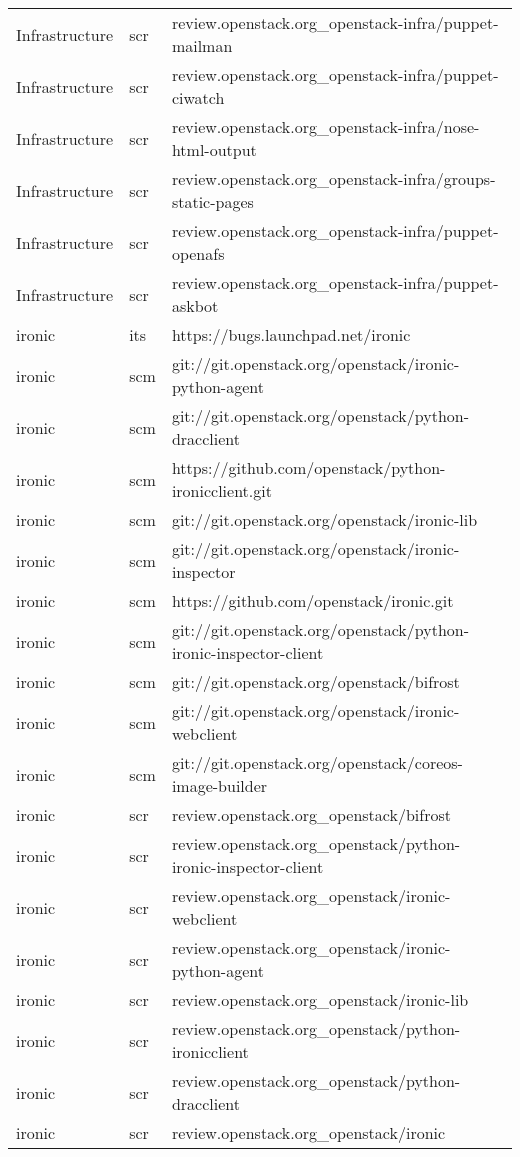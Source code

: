 \begin{center}
\begin{longtable}{|p{4cm}|p{1cm}|p{10cm}|}
Infrastructure&scr&review.openstack.org\_openstack-infra/puppet-mailman\\ 
Infrastructure&scr&review.openstack.org\_openstack-infra/puppet-ciwatch\\ 
Infrastructure&scr&review.openstack.org\_openstack-infra/nose-html-output\\ 
Infrastructure&scr&review.openstack.org\_openstack-infra/groups-static-pages\\ 
Infrastructure&scr&review.openstack.org\_openstack-infra/puppet-openafs\\ 
Infrastructure&scr&review.openstack.org\_openstack-infra/puppet-askbot\\ 
ironic&its&https://bugs.launchpad.net/ironic\\ 
ironic&scm&git://git.openstack.org/openstack/ironic-python-agent\\ 
ironic&scm&git://git.openstack.org/openstack/python-dracclient\\ 
ironic&scm&https://github.com/openstack/python-ironicclient.git\\ 
ironic&scm&git://git.openstack.org/openstack/ironic-lib\\ 
ironic&scm&git://git.openstack.org/openstack/ironic-inspector\\ 
ironic&scm&https://github.com/openstack/ironic.git\\ 
ironic&scm&git://git.openstack.org/openstack/python-ironic-inspector-client\\ 
ironic&scm&git://git.openstack.org/openstack/bifrost\\ 
ironic&scm&git://git.openstack.org/openstack/ironic-webclient\\ 
ironic&scm&git://git.openstack.org/openstack/coreos-image-builder\\ 
ironic&scr&review.openstack.org\_openstack/bifrost\\ 
ironic&scr&review.openstack.org\_openstack/python-ironic-inspector-client\\ 
ironic&scr&review.openstack.org\_openstack/ironic-webclient\\ 
ironic&scr&review.openstack.org\_openstack/ironic-python-agent\\ 
ironic&scr&review.openstack.org\_openstack/ironic-lib\\ 
ironic&scr&review.openstack.org\_openstack/python-ironicclient\\ 
ironic&scr&review.openstack.org\_openstack/python-dracclient\\ 
ironic&scr&review.openstack.org\_openstack/ironic\\ 

\end{longtable}
\end{center}
